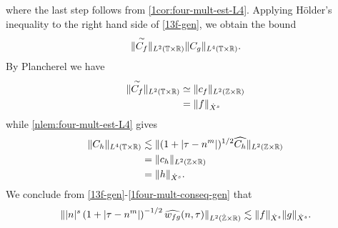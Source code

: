 %
where the last step follows from \cref{1cor:four-mult-est-L4}.
%
%
Applying H\"{o}lder's inequality to the right hand side of
\eqref{13f-gen}, we obtain the bound
%
\begin{equation}
	\label{14f-gen}
	\begin{split}
		\|\overset{\sim}{C_f} \|_{L^2(\mathbb{T} \times \mathbb{R})} \|C_g \|_{L^4\left( \mathbb{T} 
		\times \mathbb{R} 
		\right)}. 
	\end{split}
\end{equation}
%
By Plancherel we have
%
%
\begin{equation}
	\label{15f-gen}
	\begin{split}
		\|\overset{\sim}{C_f} \|_{L^2(\mathbb{T} \times \mathbb{R})}
		& \simeq \|c_f\|_{L^2(\mathbb{Z} \times \mathbb{R})}
		\\
		& = \|f \|_{\dot{X}^s}
	\end{split}
\end{equation}
%
while \cref{nlem:four-mult-est-L4} gives
%
%
\begin{equation}
	\label{1four-mult-conseq-gen}
	\begin{split}
		\|C_h\|_{L^4(\mathbb{T} \times \mathbb{R})} 
		& \lesssim \|(1 + | \tau - n^m |)^{1/2} \widehat{C_h}
		\|_{L^2(\mathbb{Z} \times \mathbb{R})}
		\\
		& = \|c_{h} \|_{L^2(\mathbb{Z} \times \mathbb{R})} 
		\\
		& = \|h \|_{\dot{X}^s}. 
	\end{split}
\end{equation}
%
%
We conclude from \eqref{13f-gen}-\eqref{1four-mult-conseq-gen} that
%
%
\begin{equation*}
	\begin{split}
		\| |n|^s \left( 1 + | \tau - n^m | \right)^{-1/2} \widehat{w_{fg}}(n, \tau) 
		 \|_{L^2(\dot{\mathbb{Z}} \times \mathbb{R})}
		 \lesssim \|f\|_{\dot{X}^s} \|g\|_{\dot{X}^s}.
	\end{split}
\end{equation*}
%
%
%
%
